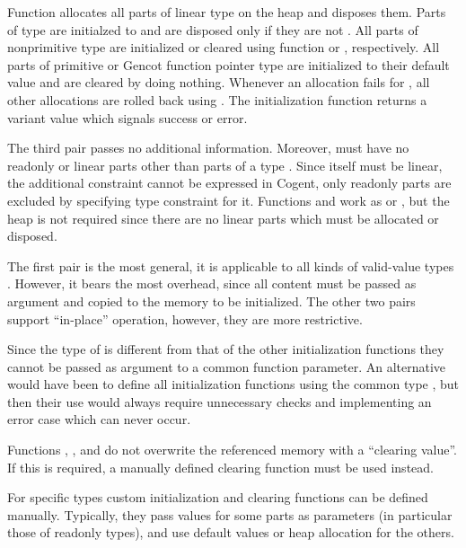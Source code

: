 Function  allocates all parts of linear type on the heap 
and  disposes them. Parts of type  are initialzed to  and are disposed only 
if they are not . 
All parts of nonprimitive type are initialized or cleared using function  or , respectively.
All parts of primitive or Gencot function pointer type are initialized to their default value  and are cleared by
doing nothing. Whenever an allocation fails for 
, all other allocations are rolled back using . The initialization function returns a variant
value which signals success or error.

The third pair passes no additional information. Moreover,  must have no readonly or linear parts other than 
parts of a type .
Since  itself must be linear, the additional constraint cannot be expressed in Cogent, 
only readonly parts are excluded by specifying type constraint  for it. 
Functions  and  work as  or ,
but the heap is not required since there are no linear parts which must be allocated or disposed.

The first pair is the most general, it is applicable to all kinds of valid-value types . However, it bears the
most overhead, since all content must be passed as argument and copied to the memory to be initialized. The other
two pairs support ``in-place'' operation, however, they are more restrictive. 

Since the type of  is different from that of the other initialization functions they cannot 
be passed as argument to a common function parameter. An alternative would have been to define all initialization
functions using the common type , but then their use would always require unnecessary checks and
implementing an error case which can never occur.

Functions , , and  do not overwrite the referenced memory with a 
``clearing value''. If this is required, a manually defined clearing function must be used instead.

For specific types  custom initialization and clearing functions can be defined manually. Typically, they 
pass values for some parts as parameters (in particular those of readonly types), and use default values or heap
allocation for the others.

